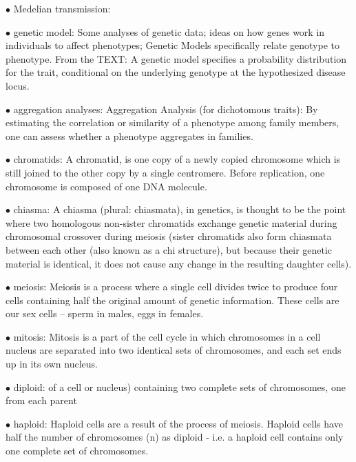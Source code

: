 \documentclass{article}
\begin{document}
\vspace{0.1in}
$\bullet$ Medelian transmission:

\vspace{0.1in}
$\bullet$ genetic model:
Some analyses of genetic data; ideas on how genes work in individuals to affect phenotypes;
Genetic Models specifically relate genotype to phenotype.
From the TEXT: A genetic model specifies a probability distribution for the trait, conditional on the underlying genotype at the hypothesized disease locus.

\vspace{0.1in}
$\bullet$ aggregation analyses:
Aggregation Analysis (for dichotomous traits): By estimating the correlation or
similarity of a phenotype among family members, one can assess whether a phenotype
aggregates in families.

\vspace{0.1in}
$\bullet$ chromatids:
A chromatid, is one copy of a newly copied chromosome which is still joined to the other copy by a single centromere. Before replication, one chromosome is composed of one DNA molecule.


\vspace{0.1in}
$\bullet$ chiasma:
A chiasma (plural: chiasmata), in genetics, is thought to be the point where two homologous non-sister chromatids exchange genetic material during chromosomal crossover during meiosis (sister chromatids also form chiasmata between each other (also known as a chi structure), but because their genetic material is identical, it does not cause any change in the resulting daughter cells). 

\vspace{0.1in}
$\bullet$ meiosis:
Meiosis is a process where a single cell divides twice to produce four cells containing half the original amount of genetic information. These cells are our sex cells – sperm in males, eggs in females.

\vspace{0.1in}
$\bullet$ mitosis:
Mitosis is a part of the cell cycle in which chromosomes in a cell nucleus are separated into two identical sets of chromosomes, and each set ends up in its own nucleus.

\vspace{0.1in}
$\bullet$ diploid:
of a cell or nucleus) containing two complete sets of chromosomes, one from each parent

\vspace{0.1in}
$\bullet$ haploid:
Haploid cells are a result of the process of meiosis. Haploid cells have half the number of chromosomes (n) as diploid - i.e. a haploid cell contains only one complete set of chromosomes.
\end{document}
